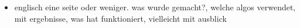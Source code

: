 \lipsum[1]
\begin{itemize}
    \item englisch eine seite oder weniger. was wurde gemacht?, welche algos verwendet, mit ergebnisse, was hat funktioniert, vielleicht mit ausblick
\end{itemize}